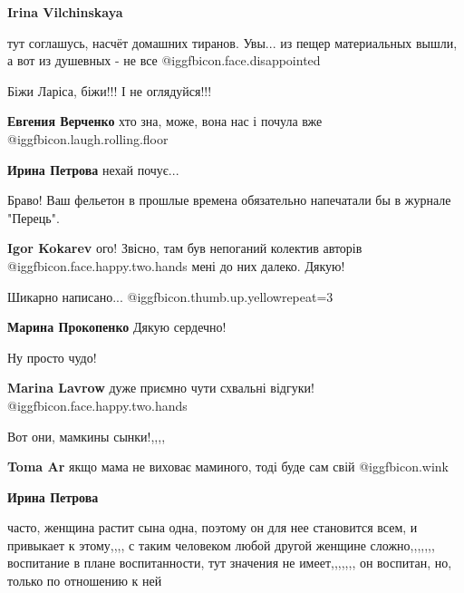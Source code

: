 \begin{itemize}
\begin{itemize}
\begin{itemize}
\end{itemize} %

\textbf{Irina Vilchinskaya} 

тут соглашусь, насчёт домашних тиранов. Увы... из пещер материальных вышли, а
вот из душевных - не все @igg{fbicon.face.disappointed} 

\end{itemize} %

Біжи Ларіса, біжи!!!
І не оглядуйся!!!

\begin{itemize} %
\textbf{Евгения Верченко} хто зна, може, вона нас і почула вже  @igg{fbicon.laugh.rolling.floor} 

\textbf{Ирина Петрова} нехай почує...
\end{itemize} %

Браво! Ваш фельетон в прошлые времена обязательно напечатали бы в журнале "Перець".

\begin{itemize} %
\textbf{Igor Kokarev} ого! Звісно, там був непоганий колектив авторів @igg{fbicon.face.happy.two.hands}  мені до них далеко. Дякую!
\end{itemize} %

Шикарно написано...
 @igg{fbicon.thumb.up.yellow}{repeat=3} 

\textbf{Марина Прокопенко} Дякую сердечно!

Ну просто чудо!

\textbf{Marina Lavrow} дуже приємно чути схвальні відгуки! @igg{fbicon.face.happy.two.hands} 

Вот они, мамкины сынки!,,,,

\begin{itemize} %
\textbf{Toma Ar} якщо мама не виховає маминого, тоді буде сам свій @igg{fbicon.wink} 

\textbf{Ирина Петрова} 

часто, женщина растит сына одна, поэтому он для нее становится всем, и
привыкает к этому,,,, с таким человеком любой другой женщине
сложно,,,,,,, воспитание в плане воспитанности, тут значения не имеет,,,,,,, он
воспитан, но, только по отношению к ней

\end{itemize} %


\end{itemize}
